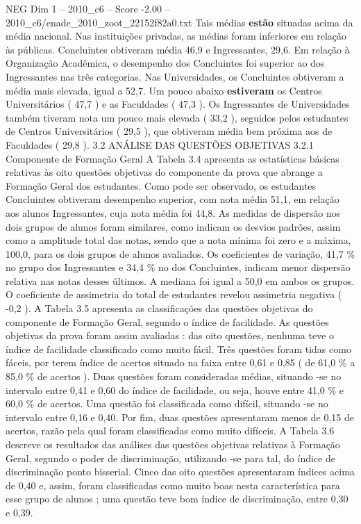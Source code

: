 \begin{textsample}{NEG Dim 1 – 2010\_c6 – Score -2.00 – 2010\_c6/enade\_2010\_zoot\_22152f82a0.txt}
Tais médias \textbf{estão} situadas acima da média nacional.
Nas instituições privadas, as médias foram inferiores em relação às públicas.
Concluintes obtiveram média 46,9 e Ingressantes, 29,6.
Em relação à Organização Acadêmica, o desempenho dos Concluintes foi superior ao dos Ingressantes nas três categorias.
Nas Universidades, os Concluintes obtiveram a média mais elevada, igual a 52,7.
Um pouco abaixo \textbf{estiveram} os Centros Universitários ( 47,7 ) e as Faculdades ( 47,3 ).
Os Ingressantes de Universidades também tiveram nota um pouco mais elevada ( 33,2 ), seguidos pelos estudantes de Centros Universitários ( 29,5 ), que obtiveram média bem próxima aos de Faculdades ( 29,8 ). 3.2 ANÁLISE DAS QUESTÕES OBJETIVAS 3.2.1 Componente de Formação Geral A Tabela 3.4 apresenta as estatísticas básicas relativas às oito questões objetivas do componente da prova que abrange a Formação Geral dos estudantes.
Como pode ser observado, os estudantes Concluintes obtiveram desempenho superior, com nota média 51,1, em relação aos alunos Ingressantes, cuja nota média foi 44,8.
As medidas de dispersão nos dois grupos de alunos foram similares, como indicam os desvios padrões, assim como a amplitude total das notas, sendo que a nota mínima foi zero e a máxima, 100,0, para os dois grupos de alunos avaliados.
Os coeficientes de variação, 41,7 \% no grupo dos Ingressantes e 34,4 \% no dos Concluintes, indicam menor dispersão relativa nas notas desses últimos.
A mediana foi igual a 50,0 em ambos os grupos.
O coeficiente de assimetria do total de estudantes revelou assimetria negativa ( -0,2 ).
A Tabela 3.5 apresenta as classificações das questões objetivas do componente de Formação Geral, segundo o índice de facilidade.
As questões objetivas da prova foram assim avaliadas : das oito questões, nenhuma teve o índice de facilidade classificado como muito fácil.
Três questões foram tidas como fáceis, por terem índice de acertos situado na faixa entre 0,61 e 0,85 ( de 61,0 \% a 85,0 \% de acertos ).
Duas questões foram consideradas médias, situando -se no intervalo entre 0,41 e 0,60 do índice de facilidade, ou seja, houve entre 41,0 \% e 60,0 \% de acertos.
Uma questão foi classificada como difícil, situando -se no intervalo entre 0,16 e 0,40.
Por fim, duas questões apresentaram menos de 0,15 de acertos, razão pela qual foram classificadas como muito difíceis.
A Tabela 3.6 descreve os resultados das análises das questões objetivas relativas à Formação Geral, segundo o poder de discriminação, utilizando -se para tal, do índice de discriminação ponto bisserial.
Cinco das oito questões apresentaram índices acima de 0,40 e, assim, foram classificadas como muito boas nesta característica para esse grupo de alunos ; uma questão teve bom índice de discriminação, entre 0,30 e 0,39.

\end{textsample}
